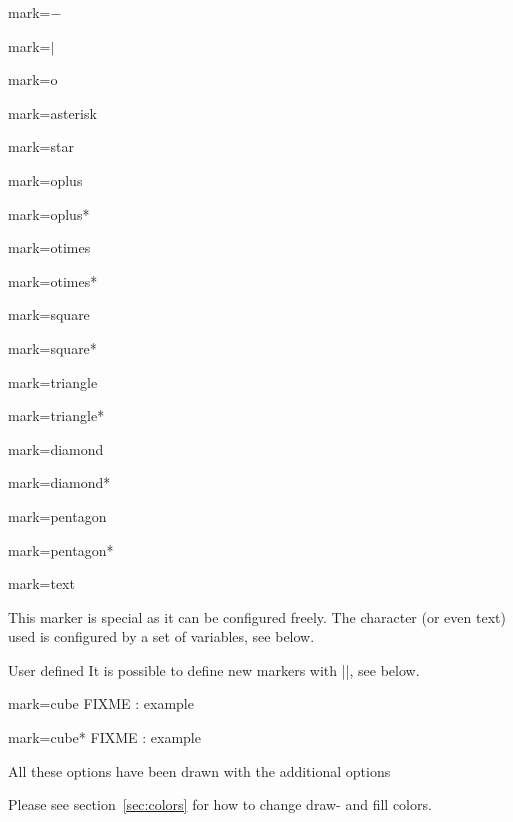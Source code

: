 \begin{longdescription}
	\item[mark=$-$] 
	\item[mark=$\vert$] 
	\item[mark=o] 
	\item[mark=asterisk] 
	\item[mark=star] 
	\item[mark=oplus] 
	\item[mark=oplus*] 
	\item[mark=otimes] 
	\item[mark=otimes*] 
	\item[mark=square] 
	\item[mark=square*] 
	\item[mark=triangle] 
	\item[mark=triangle*] 
	\item[mark=diamond] 
	\item[mark=diamond*] 
	\item[mark=pentagon] 
	\item[mark=pentagon*] 
	\item[mark=text]  

	This marker is special as it can be configured freely. The character (or even text) used is configured by a set of variables, see below.
	\item[User defined] It is possible to define new markers with |\pgfdeclareplotmark|, see below.
	\item[mark=cube] FIXME : example
	\item[mark=cube*] FIXME : example
\end{longdescription}
All these options have been drawn with the additional options
\begin{codeexample}
\draw[
	gray,
	thin,
	mark options={%
		scale=2,fill=yellow!80!black,draw=black
	}
]
\end{codeexample}
Please see section~\ref{sec:colors} for how to change draw- and fill colors.

